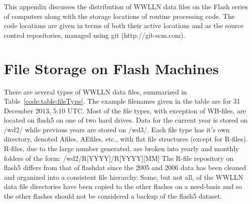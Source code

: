 This appendix discusses the distribution of WWLLN data files on the Flash series of computers along with the storage locations of routine processing code.
The code locations are given in terms of both their active locations and as the source control repositories, managed using git (http://git-scm.com).

\section{File Storage on Flash Machines}

There are several types of WWLLN data files, summarized in Table~\ref{code:table:fileType}.
The example filenames given in the table are for 31 December 2013, 5:10 UTC.
Most of the file types, with exception of WB-files, are located on flash5 on one of two hard drives.
Data for the current year is stored on /wd2/ while previous years are stored on /wd3/.
Each file type has it's own directory, denoted Afiles, AEfiles, etc., with flat file structures (except for R-files).
R-files, due to the large number generated, are broken into yearly and monthly folders of the form: /wd2/R[YYYY]/R[YYYY][MM]
The R-file repository on flash5 differs from that of flashdat since the 2005 and 2006 data has been cleaned and organized into a consistent file hierarchy.
Some, but not all, of the WWLLN data file directories have been copied to the other flashes on a need-basis and so the other flashes should not be considered a backup of the flash5 dataset.

